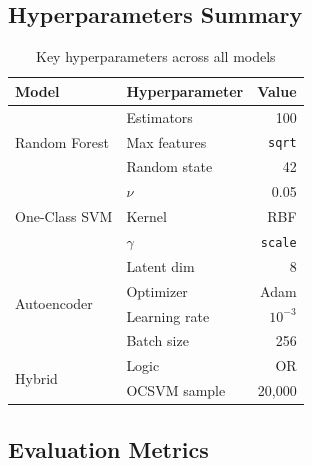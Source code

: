 \documentclass[10pt,conference]{IEEEtran}
\begin{document}
\subsection{Hyperparameters Summary}

\begin{table}[H]
\centering
\caption{Key hyperparameters across all models}
\label{tab:hyperparams}
\begin{tabular}{llr}
\toprule
\textbf{Model} & \textbf{Hyperparameter} & \textbf{Value} \\
\midrule
\multirow{3}{*}{Random Forest}
  & Estimators      & 100 \\
  & Max features    & \texttt{sqrt} \\
  & Random state    & 42 \\
\midrule
\multirow{3}{*}{One-Class SVM}
  & $\nu$           & 0.05 \\
  & Kernel          & RBF \\
  & $\gamma$        & \texttt{scale} \\
\midrule
\multirow{4}{*}{Autoencoder}
  & Latent dim      & 8 \\
  & Optimizer       & Adam \\
  & Learning rate   & $10^{-3}$ \\
  & Batch size      & 256 \\
\midrule
\multirow{2}{*}{Hybrid}
  & Logic           & OR \\
  & OCSVM sample    & 20{,}000 \\
\bottomrule
\end{tabular}
\end{table}

\subsection{Evaluation Metrics}
\end{document}
